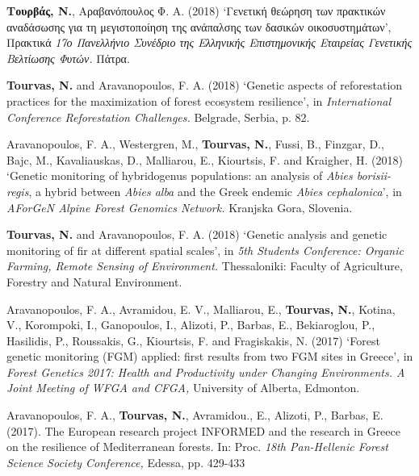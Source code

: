 \documentclass[12pt,]{scrartcl}
\begin{document}
\vspace{-3mm}
\begin{enumerate}
\leftskip-0.13in
	\setcounter{enumi}{1}
	
\leftskip-0.07in  

\leftskip-0.07in  
\item {\textbf{Τουρβάς, Ν.}, Αραβανόπουλος Φ. Α. (2018) ‘Γενετική θεώρηση των πρακτικών αναδάσωσης για τη μεγιστοποίηση της ανάπαλσης των δασικών οικοσυστημάτων’, Πρακτικά \textit{17ο Πανελλήνιο Συνέδριο της Ελληνικής Επιστημονικής Εταιρείας Γενετικής Βελτίωσης Φυτών.} Πάτρα.}

\leftskip-0.07in  
\item {\textbf{Tourvas, N.} and Aravanopoulos, F. A. (2018) ‘Genetic aspects of reforestation practices for the maximization of forest ecosystem resilience’, in \textit{International Conference Reforestation Challenges.} Belgrade, Serbia, p. 82.}

\leftskip-0.07in  
\item {Aravanopoulos, F. A., Westergren, M., \textbf{Tourvas, N.}, Fussi, B., Finzgar, D., Bajc, M., Kavaliauskas, D., Malliarou, E., Kiourtsis, F. and Kraigher, H. (2018) ‘Genetic monitoring of hybridogenus populations: an analysis of \textit{Abies borisii-regis}, a hybrid between \textit{Abies alba }and the Greek endemic \textit{Abies cephalonica}’, in \textit{AForGeN Alpine Forest Genomics Network.} Kranjska Gora, Slovenia.}

\item {\textbf{Tourvas, N.} and Aravanopoulos, F. A. (2018) ‘Genetic analysis and genetic monitoring of fir at different spatial scales’, in \textit{5th Students Conference: Organic Farming, Remote Sensing of Environment.} Thessaloniki: Faculty of Agriculture, Forestry and Natural Environment.

\leftskip-0.07in  
\item {Aravanopoulos, F. A., Avramidou, E. V., Malliarou, E., \textbf{Tourvas, N.}, Kotina, V., Korompoki, I., Ganopoulos, I., Alizoti, P., Barbas, E., Bekiaroglou, P., Hasilidis, P., Roussakis, G., Kiourtsis, F. and Fragiskakis, N. (2017) ‘Forest genetic monitoring (FGM) applied: first results from two FGM sites in Greece’, in \textit{Forest Genetics 2017: Health and Productivity under Changing Environments. A Joint Meeting of WFGA and CFGA,} University of Alberta, Edmonton.}

\leftskip-0.07in  
\item {Aravanopoulos, F. Α., \textbf{Tourvas, N.}, Avramidou., E., Alizoti, P., Barbas, E. (2017). The European research project INFORMED and the research in Greece on the resilience of Mediterranean forests. In: Proc. \textit{18th Pan-Hellenic Forest Science Society Conference,} Edessa, pp. 429-433}
 
}
\end{enumerate}
\end{document}
